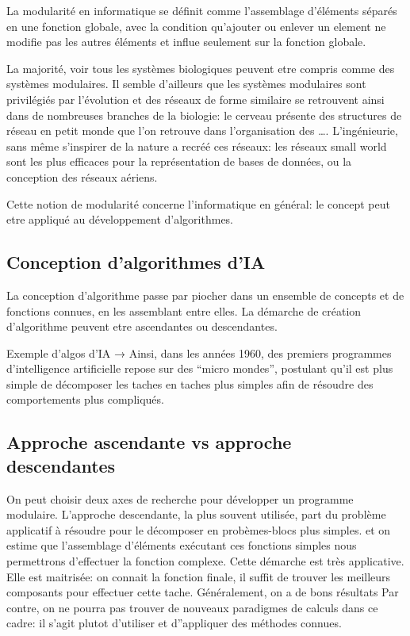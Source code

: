 \documentclass[../main]{subfiles}
\begin{document}
La modularité en informatique se définit comme l'assemblage d'éléments séparés en une fonction globale, avec la condition qu'ajouter ou enlever un element ne modifie pas les autres éléments et influe seulement sur la fonction globale.

La majorité, voir tous les systèmes biologiques peuvent etre compris comme des systèmes modulaires. Il semble d'ailleurs que les systèmes modulaires sont privilégiés par l'évolution et des réseaux de forme similaire se retrouvent ainsi dans de nombreuses branches de la biologie: le cerveau présente des structures de réseau en petit monde que l'on retrouve dans l'organisation des ….
L'ingénieurie, sans même s'inspirer de la nature a recréé ces réseaux: les réseaux small world sont les plus efficaces pour la représentation de bases de données, ou la conception des réseaux aériens.
	
Cette notion de modularité concerne l'informatique en général: le concept peut etre appliqué au développement d'algorithmes.


\subsection*{Conception d'algorithmes d'IA}

La conception d'algorithme passe par piocher dans un ensemble de concepts et de fonctions connues, en les assemblant entre elles. 
La démarche de création d'algorithme peuvent etre ascendantes ou descendantes. 

Exemple d'algos d'IA → 
Ainsi, dans les années 1960, des premiers programmes d'intelligence artificielle repose sur des “micro mondes”, postulant qu'il est plus simple de décomposer les taches en taches plus simples afin de résoudre des comportements plus compliqués.

\subsection*{Approche ascendante vs approche descendantes}

On peut choisir deux axes de recherche pour développer un programme modulaire.
 L'approche descendante, la plus souvent utilisée, part du problème applicatif à résoudre pour le décomposer en probèmes-blocs plus simples.  et on estime que l'assemblage d'éléments exécutant ces fonctions simples nous permettrons d'effectuer la fonction complexe.
Cette démarche est très applicative. Elle est maitrisée: on connait la fonction finale, il suffit de trouver les meilleurs composants pour effectuer cette tache. Généralement, on a de bons résultats
Par contre, on ne pourra pas trouver de nouveaux paradigmes de calculs dans ce cadre: il s’agit plutot d’utiliser et d”appliquer des méthodes connues. 
\end{document}

